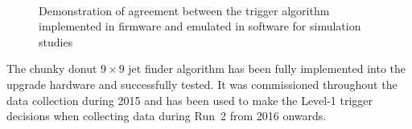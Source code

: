 \begin{figure}
  \centering
  ~ 
  \caption{Demonstration of agreement between the trigger algorithm
  implemented in firmware and emulated in software for simulation
  studies}
  \label{fig:firmwareEmu}
\end{figure}

The chunky donut $9\times9$ \TT jet finder algorithm has been fully
implemented into the upgrade hardware and successfully tested. It was
commissioned throughout the data collection during 2015 and has been
used to make the Level-1 trigger decisions when collecting data during
Run~2 from 2016 onwards.



